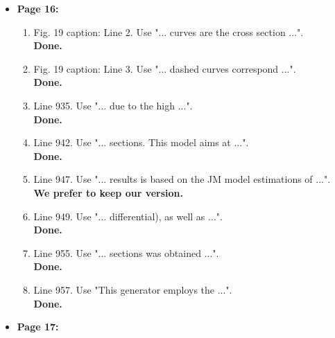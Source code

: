 \documentclass[,superscriptaddress,showpacs,amssymb,amsmath,amsfonts,linenumbers,article]{revtex4-1}
\begin{document}
\begin{itemize}
\begin{enumerate}
\end{enumerate} 


\item {\bf \large  Page 16:}
\begin{enumerate}

\item Fig. 19 caption: Line 2. Use "... curves are the cross section ...".\\
{\bf Done.}
\item Fig. 19 caption: Line 3. Use "... dashed curves correspond ...".\\
{\bf Done.}
\item Line 935. Use "... due to the high ...".\\
{\bf Done.}
\item Line 942. Use "... sections. This model aims at ...".\\
{\bf Done.}
\item Line 947. Use "... results is based on the JM model estimations of ...".\\
{\bf We prefer to keep our version.}
\item Line 949. Use "... differential), as well as ...".\\
{\bf Done.}
\item Line 955. Use "... sections was obtained ...".\\
{\bf Done.}
\item Line 957. Use "This generator employs the ...".\\
{\bf Done.}

\end{enumerate}  


\item {\bf \large  Page 17:}
\begin{enumerate}


\end{enumerate}
\end{itemize}
\end{document}
